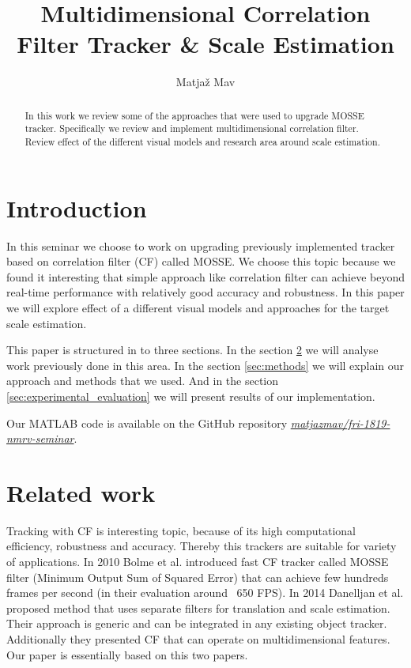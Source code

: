 \documentclass[runningheads]{llncs}
\begin{document}
% 
\title{Multidimensional Correlation Filter Tracker \& Scale Estimation}
\author{Matjaž Mav}
%
\maketitle
%
\begin{abstract}
In this work we review some of the approaches that were used to upgrade MOSSE tracker. Specifically we review and implement multidimensional correlation filter. Review effect of the different visual models and research area around scale estimation.
\end{abstract}

\section{Introduction}
In this seminar we choose to work on upgrading previously implemented tracker based on correlation filter (CF) called MOSSE. We choose this topic because we found it interesting that simple approach like correlation filter can achieve beyond real-time performance with relatively good accuracy and robustness. In this paper we will explore effect of a different visual models and approaches for the target scale estimation.

This paper is structured in to three sections. In the section \ref{sec:related_work} we will analyse work previously done in this area. In the section \ref{sec:methods} we will explain our approach and methods that we used. And in the section \ref{sec:experimental_evaluation} we will present results of our implementation.

Our MATLAB code is available on the GitHub repository \href{https://github.com/matjazmav/fri-1819-nmrv-seminar}{\textit{matjazmav/fri-1819-nmrv-seminar}}.

\section{Related work}
\label{sec:related_work}
Tracking with CF is interesting topic, because of its high computational efficiency, robustness and accuracy. Thereby this trackers are suitable for variety of applications. In 2010 Bolme et al. \cite{bolme2010visual} introduced fast CF tracker called MOSSE filter (Minimum Output Sum of Squared Error) that can achieve few hundreds frames per second (in their evaluation around ~650 FPS).  In 2014 Danelljan et al. \cite{danelljan2014accurate} proposed method that uses separate filters for translation and scale estimation. Their approach is generic and can be integrated in any existing object tracker. Additionally they presented CF that can operate on multidimensional features. Our paper is essentially based on this two papers.
\end{document}
